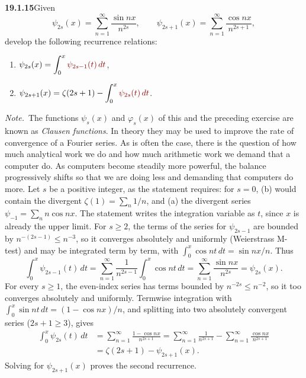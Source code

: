 \par\bigskip
\noindent\textbf{19.1.15}\quad Given
\[
\psi_{2s}(x)=\sum_{n=1}^{\infty}\frac{\sin nx}{n^{2s}},\qquad
\psi_{2s+1}(x)=\sum_{n=1}^{\infty}\frac{\cos nx}{n^{2s+1}},
\]
develop the following recurrence relations:
\begin{enumerate}
\item[(a)] $\psi_{2s}(x)=\displaystyle\int_{0}^{x}
\erratum{\psi_{2s-1}(t)\,dt}$,
\item[(b)] $\psi_{2s+1}(x)=\zeta(2s+1)
-\displaystyle\int_{0}^{x}\erratum{\psi_{2s}(t)\,dt}$.
\end{enumerate}
\par\emph{Note.}~The functions $\psi_{s}(x)$ and $\varphi_{s}(x)$
of this and the preceding exercise are known as \emph{Clausen
functions}. In theory they may be used to improve the rate of
convergence of a Fourier series. As is often the case, there is the
question of how much analytical work we do and how much arithmetic
work we demand that a computer do. As computers become steadily
more powerful, the balance progressively shifts so that we are
doing less and demanding that computers do more.
\solution
Let $s$ be a positive integer, as the statement requires: for $s=0$,
(b) would contain the divergent $\zeta(1)=\sum_n1/n$, and (a) the
divergent series $\psi_{-1}=\sum_nn\cos nx$. The statement writes the
integration variable as $t$, since $x$ is already the upper limit.
For $s\ge2$, the terms of the series for $\psi_{2s-1}$ are bounded by
$n^{-(2s-1)}\le n^{-3}$, so it converges absolutely and uniformly
(Weierstrass M-test) and may be integrated term by term, with
$\int_0^x\cos nt\,dt=\sin nx/n$. Thus
\[
\int_0^x\psi_{2s-1}(t)\,dt
=\sum_{n=1}^{\infty}\frac1{n^{2s-1}}\int_0^x\cos nt\,dt
=\sum_{n=1}^{\infty}\frac{\sin nx}{n^{2s}}
=\boxed{\psi_{2s}(x)}.
\]
For every $s\ge1$, the even-index series has terms bounded by
$n^{-2s}\le n^{-2}$, so it too converges absolutely and uniformly.
Termwise integration with $\int_0^x\sin nt\,dt=(1-\cos nx)/n$, and
splitting into two absolutely convergent series ($2s+1\ge3$), gives
\begin{align*}
\int_0^x\psi_{2s}(t)\,dt
&=\sum_{n=1}^{\infty}\frac{1-\cos nx}{n^{2s+1}}
=\sum_{n=1}^{\infty}\frac1{n^{2s+1}}
-\sum_{n=1}^{\infty}\frac{\cos nx}{n^{2s+1}}\\
&=\zeta(2s+1)-\psi_{2s+1}(x).
\end{align*}
Solving for $\psi_{2s+1}(x)$ proves the second recurrence.


